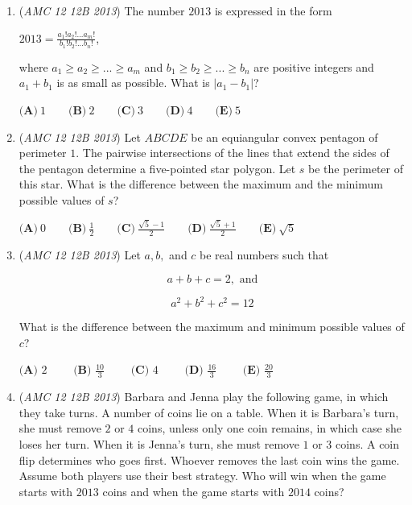 \begin{enumerate}
 $\textbf{(A)}\ 55 \qquad \textbf{(B)}\ 89 \qquad \textbf{(C)}\ 104 \qquad \textbf{(D)}\ 144 \qquad \textbf{(E)}\ 273$


	\item (\textit{AMC 12 12B 2013}) 
The number $2013$ is expressed in the form 
 

  $2013 = \frac {a_1!a_2!...a_m!}{b_1!b_2!...b_n!}$,

 
where $a_1 \ge a_2 \ge ... \ge a_m$ and $b_1 \ge b_2 \ge ... \ge b_n$ are positive integers and $a_1 + b_1$ is as small as possible. What is $|a_1 - b_1|$?


 $\textbf{(A)}\ 1 \qquad \textbf{(B)}\ 2 \qquad \textbf{(C)}\ 3 \qquad \textbf{(D)}\ 4 \qquad \textbf{(E)}\ 5$


	\item (\textit{AMC 12 12B 2013}) Let $ABCDE$ be an equiangular convex pentagon of perimeter $1$. The pairwise intersections of the lines that extend the sides of the pentagon determine a five-pointed star polygon. Let $s$ be the perimeter of this star. What is the difference between the maximum and the minimum possible values of $s$?


 $\textbf{(A)}\ 0 \qquad \textbf{(B)}\ \frac{1}{2} \qquad \textbf{(C)}\ \frac{\sqrt{5}-1}{2} \qquad \textbf{(D)}\  \frac{\sqrt{5}+1}{2} \qquad \textbf{(E)}\ \sqrt{5}$


	\item (\textit{AMC 12 12B 2013}) Let $a,b,$ and $c$ be real numbers such that 


 
 \[a+b+c=2, \text{ and}\]

 \[a^2+b^2+c^2=12\]


 What is the difference between the maximum and minimum possible values of $c$?


 $\textbf{(A) }2\qquad \textbf{ (B) }\frac{10}{3}\qquad \textbf{ (C) }4 \qquad \textbf{ (D) }\frac{16}{3}\qquad \textbf{ (E) }\frac{20}{3}$


	\item (\textit{AMC 12 12B 2013}) Barbara and Jenna play the following game, in which they take turns. A number of coins lie on a table. When it is Barbara’s turn, she must remove $2$ or $4$ coins, unless only one coin remains, in which case she loses her turn. When it is Jenna’s turn, she must remove $1$ or $3$ coins. A coin flip determines who goes first. Whoever removes the last coin wins the game. Assume both players use their best strategy. Who will win when the game starts with $2013$ coins and when the game starts with $2014$ coins?



\end{enumerate}
